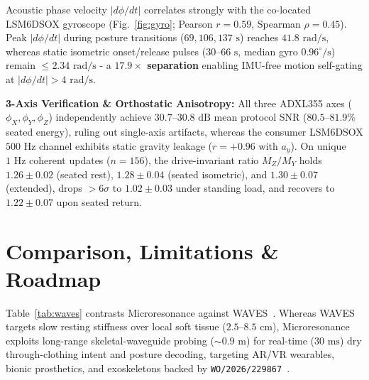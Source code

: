 \documentclass[conference]{IEEEtran}
\begin{document}
Acoustic phase velocity $|d\phi/dt|$ correlates strongly with the co-located LSM6DSOX gyroscope (Fig.~\ref{fig:gyro}; Pearson $r = 0.59$, Spearman $\rho = 0.45$). Peak $|d\phi/dt|$ during posture transitions ($69, 106, 137\text{ s}$) reaches $41.8\text{ rad/s}$, whereas static isometric onset/release pulses ($30\text{--}66\text{ s}$, median gyro $0.96^\circ/\text{s}$) remain $\le 2.34\text{ rad/s}$ - a \textbf{$17.9\times$ separation} enabling IMU-free motion self-gating at $|d\phi/dt| > 4\text{ rad/s}$.

\textbf{3-Axis Verification \& Orthostatic Anisotropy:} All three ADXL355 axes ($\phi_X, \phi_Y, \phi_Z$) independently achieve $30.7\text{--}30.8\text{ dB}$ mean protocol SNR ($80.5\text{--}81.9\%$ seated energy), ruling out single-axis artifacts, whereas the consumer LSM6DSOX $500\text{ Hz}$ channel exhibits static gravity leakage ($r = +0.96$ with $a_y$). On unique $1\text{ Hz}$ coherent updates ($n=156$), the drive-invariant ratio $M_Z/M_Y$ holds $1.26 \pm 0.02$ (seated rest), $1.28 \pm 0.04$ (seated isometric), and $1.30 \pm 0.07$ (extended), drops $>6\sigma$ to $1.02 \pm 0.03$ under standing load, and recovers to $1.22 \pm 0.07$ upon seated return.

\section{Comparison, Limitations \& Roadmap}
Table~\ref{tab:waves} contrasts Microresonance against WAVES~\cite{rohal2026waves}. Whereas WAVES targets slow resting stiffness over local soft tissue ($2.5\text{--}8.5\text{ cm}$), Microresonance exploits long-range skeletal-waveguide probing ($\sim 0.9\text{ m}$) for real-time ($30\text{ ms}$) dry through-clothing intent and posture decoding, targeting AR/VR wearables, bionic prosthetics, and exoskeletons backed by \texttt{WO/2026/229867}~\cite{fatkulin2026pct}.

\begin{table}[t]
\centering
\caption{Comparison Between WAVES (2026) and Microresonance}
\label{tab:waves}
\end{table}
\end{document}
